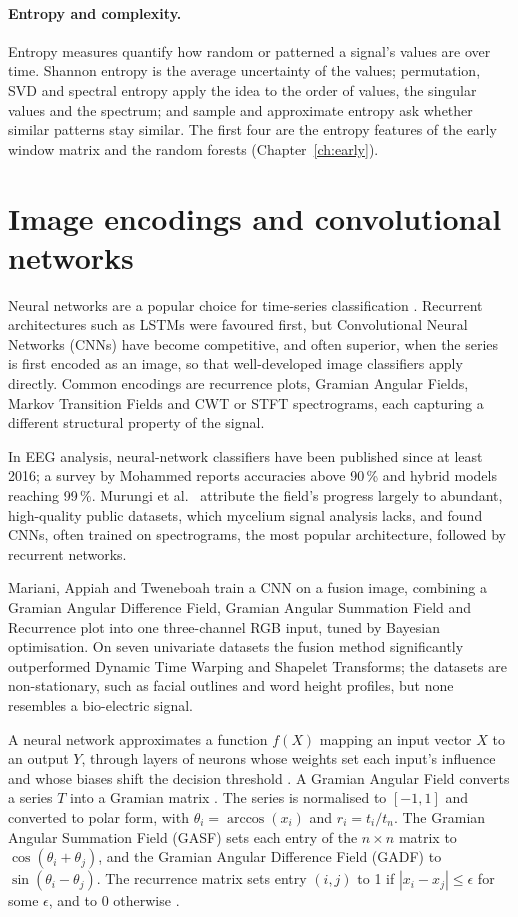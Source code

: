 \paragraph{Entropy and complexity.}
\label{sec:entropy}
Entropy measures quantify how random or patterned a signal's values are over time. Shannon entropy is the average uncertainty of the values; permutation, SVD and spectral entropy apply the idea to the order of values, the singular values and the spectrum; and sample and approximate entropy ask whether similar patterns stay similar. The first four are the entropy features of the early window matrix and the random forests (Chapter~\ref{ch:early}).

\section{Image encodings and convolutional networks}
\label{sec:litnn}
\label{sec:encodings}

Neural networks are a popular choice for time-series classification \cite{bagnall}. Recurrent architectures such as LSTMs were favoured first, but Convolutional Neural Networks (CNNs) have become competitive, and often superior, when the series is first encoded as an image, so that well-developed image classifiers apply directly. Common encodings are recurrence plots, Gramian Angular Fields, Markov Transition Fields and CWT or STFT spectrograms, each capturing a different structural property of the signal.

In EEG analysis, neural-network classifiers have been published since at least 2016; a survey by Mohammed \cite{mohammed} reports accuracies above 90\,\% and hybrid models reaching 99\,\%. Murungi et al.\ \cite{murungi} attribute the field's progress largely to abundant, high-quality public datasets, which mycelium signal analysis lacks, and found CNNs, often trained on spectrograms, the most popular architecture, followed by recurrent networks.

Mariani, Appiah and Tweneboah \cite{mariani} train a CNN on a fusion image, combining a Gramian Angular Difference Field, Gramian Angular Summation Field and Recurrence plot into one three-channel RGB input, tuned by Bayesian optimisation. On seven univariate datasets the fusion method significantly outperformed Dynamic Time Warping and Shapelet Transforms; the datasets are non-stationary, such as facial outlines and word height profiles, but none resembles a bio-electric signal.

A neural network approximates a function $f(X)$ mapping an input vector $X$ to an output $Y$, through layers of neurons whose weights set each input's influence and whose biases shift the decision threshold \cite{ibmnn}. A Gramian Angular Field converts a series $T$ into a Gramian matrix \cite{rgbgaf,devitry}. The series is normalised to $[-1,1]$ and converted to polar form, with $\theta_i = \arccos(x_i)$ and $r_i = t_i/t_n$. The Gramian Angular Summation Field (GASF) sets each entry of the $n\times n$ matrix to $\cos(\theta_i + \theta_j)$, and the Gramian Angular Difference Field (GADF) to $\sin(\theta_i - \theta_j)$. The recurrence matrix sets entry $(i,j)$ to 1 if $|x_i - x_j| \leq \epsilon$ for some $\epsilon$, and to 0 otherwise \cite{recurrence}.

